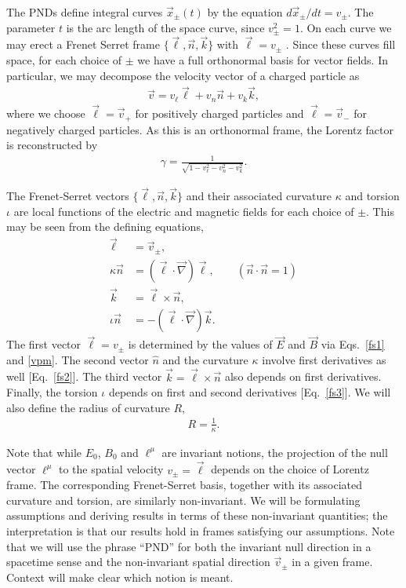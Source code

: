 \documentclass[amsmath,amssymb,nofootinbib,notitlepage,superscriptaddress,twocolumn]{revtex4-2}
\begin{document}
The PNDs define integral curves $\vec{x}_\pm(t)$ by the equation  $d\vec{x}_\pm/dt=v_\pm$.  The parameter $t$ is the arc length of the space curve, since $v_\pm^2=1$.  On each curve we may erect a Frenet Serret frame $\{\vec{\ell},\vec{n},\vec{k}\}$ with $\vec{\ell}=v_\pm$ \cite{Cai:2022mkw}.  Since these curves fill space, for each choice of $\pm$ we have a full orthonormal basis for vector fields.  In particular, we may decompose the velocity vector of a charged particle as
\begin{align}\label{vdecomp}
\Vec{v}=v_\ell\Vec{\ell}+v_n\Vec{n}+v_k\Vec{k},
\end{align}
where we choose $\vec{\ell}=\vec{v}_+$ for positively charged particles and $\vec{\ell}=\vec{v}_-$ for negatively charged particles.  As this is an orthonormal frame, the Lorentz factor is reconstructed by
\begin{align}\label{gammafun}
    \gamma = \frac{1}{\sqrt{1-v_\ell^2-v_n^2-v_k^2}}.
\end{align}

The Frenet-Serret vectors $\{ \vec{\ell}, \vec{n}, \vec{k} \}$ and their associated curvature $\kappa$ and torsion $\iota$ are local functions of the electric and magnetic fields for each choice of $\pm$.  This may be seen from the defining equations,
\begin{align}
    \vec{\ell} & = \vec{v}_{\pm}, \label{fs1} \\
    \kappa \vec{n} & =(\vec{\ell} \cdot \vec{\nabla}) \vec{\ell}, \qquad (\vec{n} \cdot \vec{n} = 1) \label{fs2} \\
    \vec{k} & = \vec{\ell} \times \vec{n}, \label{fs3} \\
    \iota \vec{n} & = - (\vec{\ell} \cdot \vec{\nabla}) \vec{k}. \label{fs4}
\end{align}
The first vector $\vec{\ell}=v_{\pm}$ is determined by the values of $\vec{E}$ and $\vec{B}$ via Eqs.~\eqref{fs1} and \eqref{vpm}.  The second vector $\hat{n}$ and the curvature $\kappa$ involve first derivatives as well  [Eq.~\eqref{fs2}].  The third vector $\vec{k} = \vec{\ell} \times \vec{n}$ also depends on first derivatives.  Finally, the torsion $\iota$ depends on first and second derivatives [Eq.~\eqref{fs3}].  We will also define the radius of curvature $R$,
\begin{align}
    R = \frac{1}{\kappa}.
\end{align}

Note that while $E_0$, $B_0$ and $\ell^\mu$ are invariant notions, the projection of the null vector $\ell^\mu$ to the spatial velocity $v_{\pm}=\vec{\ell}$ depends on the choice of Lorentz frame.  The corresponding Frenet-Serret basis, together with its associated curvature and torsion, are similarly non-invariant.  We will be formulating assumptions and deriving results in terms of these non-invariant quantities; the interpretation is that our results hold in frames satisfying our assumptions.  Note that we will use the phrase ``PND'' for both the invariant null direction in a spacetime sense and the non-invariant spatial direction $\vec{v}_\pm$ in a given frame.  Context will make clear which notion is meant.
\end{document}

